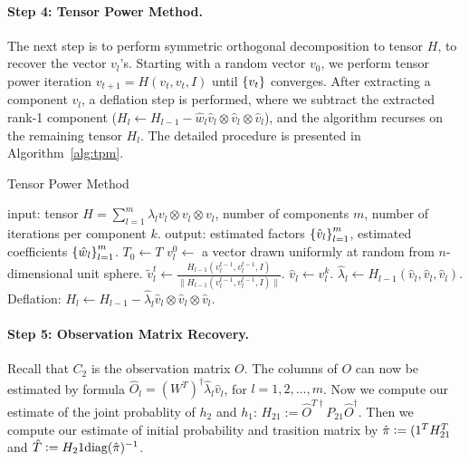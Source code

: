 \paragraph{Step 4: Tensor Power Method.} The next step is to perform symmetric orthogonal decomposition to tensor $H$, to recover the vector $v_l$'s.
Starting with a random vector $v_0$, we perform tensor power iteration $v_{t+1} = H(v_t, v_t, I)$ until $\cbr{v_t}$ converges. After extracting a component $v_l$, a deflation step is performed, where we subtract the extracted rank-1 component ($H_l \gets H_{l-1} - \hat{w}_l \hat{v}_l \otimes \hat{v}_l \otimes \hat{v}_l$), and the algorithm recurses on the remaining tensor $H_l$. The detailed procedure is presented in Algorithm~\ref{alg:tpm}.

\begin{algorithm}
\caption{Tensor Power Method}
\begin{algorithmic}
\STATE input: tensor $H = \sum_{l=1}^m \lambda_l v_l \otimes v_l \otimes v_l$, number of components $m$, number of iterations per component $k$.
\STATE output: estimated factors $\cbr{\hat{v}_l}_{l=1}^m$, estimated coefficients $\cbr{\hat{w}_l}_{l=1}^m$.
\STATE $T_0 \gets T$
    \STATE $v_l^0 \gets$ a vector drawn uniformly at random from $n$-dimensional unit sphere.
        \STATE $\tilde{v}_l^t \gets \frac{H_{l-1}(v_l^{t-1}, v_l^{t-1}, I)}{\|H_{l-1}(v_l^{t-1}, v_l^{t-1}, I)\|}$.
    \ENDFOR
    \STATE $\hat{v}_l \gets v_l^k$.
    \STATE $\hat{\lambda}_l \gets H_{l-1}(\hat{v}_l, \hat{v}_l, \hat{v}_l)$.
    \STATE Deflation: $H_l \gets H_{l-1} - \hat{\lambda}_l \hat{v}_l \otimes \hat{v}_l \otimes \hat{v}_l$.
\ENDFOR
\end{algorithmic}
\label{alg:tpm}
\end{algorithm}

\paragraph{Step 5: Observation Matrix Recovery.} Recall that $C_2$ is the observation matrix $O$.
The columns of $O$ can now be estimated by formula $\hat{O}_l = (W^T)^{\dagger} \hat\lambda_l \hat{v}_l$, for $l=1,2,\ldots,m$. %
Now we compute our estimate of the joint probablity of $h_2$ and $h_1$: $H_{21}:=\hat{O}^{T\dagger} P_21 \hat{O}^\dagger$. Then we compute our estimate of initial probability and trasition matrix by $\hat\pi := (\text{1}^T H_{21}^T$ and $\hat{T} := H_21 \text{diag}(\hat \pi)^{-1}$.

